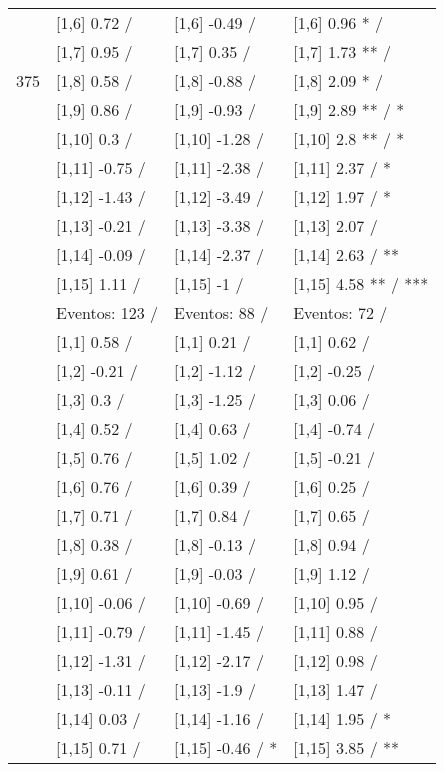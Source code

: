 \begin{table}
\begin{tabular}[t]{llll}
 & {}[1,6] 0.72  / & {}[1,6] -0.49  / & {}[1,6] 0.96 * /\\
 & {}[1,7] 0.95  / & {}[1,7] 0.35  / & {}[1,7] 1.73 ** /\\
375 & {}[1,8] 0.58  / & {}[1,8] -0.88  / & {}[1,8] 2.09 * /\\
\addlinespace
 & {}[1,9] 0.86  / & {}[1,9] -0.93  / & {}[1,9] 2.89 ** / *\\
 & {}[1,10] 0.3  / & {}[1,10] -1.28  / & {}[1,10] 2.8 ** / *\\
 & {}[1,11] -0.75  / & {}[1,11] -2.38  / & {}[1,11] 2.37  / *\\
 & {}[1,12] -1.43  / & {}[1,12] -3.49  / & {}[1,12] 1.97  / *\\
 & {}[1,13] -0.21  / & {}[1,13] -3.38  / & {}[1,13] 2.07  /\\
\addlinespace
 & {}[1,14] -0.09  / & {}[1,14] -2.37  / & {}[1,14] 2.63  / **\\
 & {}[1,15] 1.11  / & {}[1,15] -1  / & {}[1,15] 4.58 ** / ***\\
 & Eventos:  123 / & Eventos:  88 / & Eventos:  72 /\\
 & {}[1,1] 0.58  / & {}[1,1] 0.21  / & {}[1,1] 0.62  /\\
 & {}[1,2] -0.21  / & {}[1,2] -1.12  / & {}[1,2] -0.25  /\\
\addlinespace
 & {}[1,3] 0.3  / & {}[1,3] -1.25  / & {}[1,3] 0.06  /\\
 & {}[1,4] 0.52  / & {}[1,4] 0.63  / & {}[1,4] -0.74  /\\
 & {}[1,5] 0.76  / & {}[1,5] 1.02  / & {}[1,5] -0.21  /\\
 & {}[1,6] 0.76  / & {}[1,6] 0.39  / & {}[1,6] 0.25  /\\
 & {}[1,7] 0.71  / & {}[1,7] 0.84  / & {}[1,7] 0.65  /\\
\addlinespace
500 & {}[1,8] 0.38  / & {}[1,8] -0.13  / & {}[1,8] 0.94  /\\
 & {}[1,9] 0.61  / & {}[1,9] -0.03  / & {}[1,9] 1.12  /\\
 & {}[1,10] -0.06  / & {}[1,10] -0.69  / & {}[1,10] 0.95  /\\
 & {}[1,11] -0.79  / & {}[1,11] -1.45  / & {}[1,11] 0.88  /\\
 & {}[1,12] -1.31  / & {}[1,12] -2.17  / & {}[1,12] 0.98  /\\
\addlinespace
 & {}[1,13] -0.11  / & {}[1,13] -1.9  / & {}[1,13] 1.47  /\\
 & {}[1,14] 0.03  / & {}[1,14] -1.16  / & {}[1,14] 1.95  / *\\
 & {}[1,15] 0.71  / & {}[1,15] -0.46  / * & {}[1,15] 3.85  / **\\
\bottomrule
\end{tabular}
\end{table}
